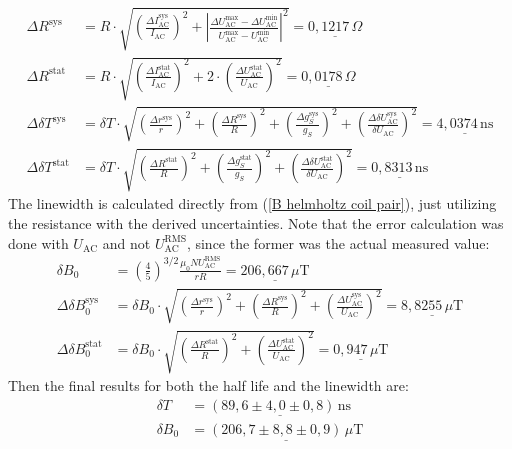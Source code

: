 \documentclass[a4paper,12pt]{article}
\newcommand{\kla}{}
\newcommand{\tecxt}{}
\begin{document}
\begin{align*}
\Delta R^\tecxt\text{sys}&=R\cdot\sqrt{\kla\left( {\frac{\Delta I_\tecxt\text{AC}^\tecxt\text{sys}}{I_\tecxt\text{AC}}} \right)^2+\left\vert \frac{\Delta U_\tecxt\text{AC}^\tecxt\text{max}-\Delta U_\tecxt\text{AC}^\tecxt\text{min}}{U_\tecxt\text{AC}^\tecxt\text{max}-U_\tecxt\text{AC}^\tecxt\text{min}} \right\vert^2}=\underline{0,1217\,\Omega}\\
\Delta R^\tecxt\text{stat}&=R\cdot\sqrt{\kla\left( {\frac{\Delta I_\tecxt\text{AC}^\tecxt\text{stat}}{I_\tecxt\text{AC}}} \right)^2+2\cdot\kla\left( {\frac{\Delta U_\tecxt\text{AC}^\tecxt\text{stat}}{U_\tecxt\text{AC}}} \right)^2}=\underline{0,0178\,\Omega}\\
\Delta\delta T^\tecxt\text{sys}&=\delta T\cdot\sqrt{\kla\left( {\frac{\Delta r^\tecxt\text{sys}}{r}} \right)^2+\kla\left( {\frac{\Delta R^\tecxt\text{sys}}{R}} \right)^2+\kla\left( {\frac{\Delta g_S^\tecxt\text{sys}}{g_S}} \right)^2+\kla\left( {\frac{\Delta\delta U_\tecxt\text{AC}^\tecxt\text{sys}}{\delta U_\tecxt\text{AC}}} \right)^2}=\underline{4,0374\,\tecxt\text{ns}}\\
\Delta\delta T^\tecxt\text{stat}&=\delta T\cdot\sqrt{\kla\left( {\frac{\Delta R^\tecxt\text{stat}}{R}} \right)^2+\kla\left( {\frac{\Delta g_S^\tecxt\text{stat}}{g_S}} \right)^2+\kla\left( {\frac{\Delta\delta U_\tecxt\text{AC}^\tecxt\text{stat}}{\delta U_\tecxt\text{AC}}} \right)^2}=\underline{0,8313\,\tecxt\text{ns}}
\end{align*}
The linewidth is calculated directly from (\ref{B helmholtz coil pair}), just utilizing the resistance with the derived uncertainties. Note that the error calculation was done with $U_\tecxt\text{AC}$ and not $U_\tecxt\text{AC}^\tecxt\text{RMS}$, since the former was the actual measured value:
\begin{align*}
\delta B_0&=\kla\left( {\frac{4}{5}} \right)^{3/2}\frac{\mu_0NU_\tecxt\text{AC}^\tecxt\text{RMS}}{rR}=\underline{206,667\,\mu\tecxt\text{T}}\\
\Delta\delta B_0^\tecxt\text{sys}&=\delta B_0\cdot\sqrt{\kla\left( {\frac{\Delta r^\tecxt\text{sys}}{r}} \right)^2+\kla\left( {\frac{\Delta R^\tecxt\text{sys}}{R}} \right)^2+\kla\left( {\frac{\Delta U_\tecxt\text{AC}^\tecxt\text{sys}}{U_\tecxt\text{AC}}} \right)^2}=\underline{8,8255\,\mu\tecxt\text{T}}\\
\Delta\delta B_0^\tecxt\text{stat}&=\delta B_0\cdot\sqrt{\kla\left( {\frac{\Delta R^\tecxt\text{stat}}{R}} \right)^2+\kla\left( {\frac{\Delta U_\tecxt\text{AC}^\tecxt\text{stat}}{U_\tecxt\text{AC}}} \right)^2}=\underline{0,947\,\mu\tecxt\text{T}}
\end{align*}
Then the final results for both the half life and the linewidth are:
\begin{align*}
\delta T&=\underline{\kla\left( {89,6\pm 4,0\pm 0,8} \right)\,\tecxt\text{ns}}\\
\delta B_0&=\underline{\kla\left( {206,7\pm 8,8\pm 0,9} \right)\,\mu\tecxt\text{T}}
\end{align*}
\end{document}
